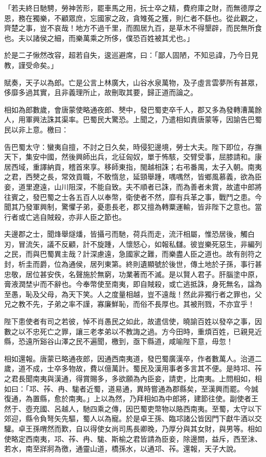 \begin{pinyinscope}
「若夫終日馳騁，勞神苦形，罷車馬之用，抏士卒之精，費府庫之財，而無德厚之恩，務在獨樂，不顧眾庶，忘國家之政，貪雉菟之獲，則仁者不繇也。從此觀之，齊楚之事，豈不哀哉！地方不過千里，而囿居九百，是草木不得墾辟，而民無所食也。夫以諸侯之細，而樂萬乘之所侈，僕恐百姓被其尤也。」

於是二子愀然改容，超若自失，逡巡避席，曰：「鄙人固陋，不知忌諱，乃今日見教，謹受命矣。」

賦奏，天子以為郎。亡是公言上林廣大，山谷水泉萬物，及子虛言雲夢所有甚眾，侈靡多過其實，且非義理所止，故刪取其要，歸正道而論之。

相如為郎數歲，會唐蒙使略通夜郎、僰中，發巴蜀吏卒千人，郡又多為發轉漕萬餘人，用軍興法誅其渠率。巴蜀民大驚恐。上聞之，乃遣相如責唐蒙等，因諭告巴蜀民以非上意。檄曰：

告巴蜀太守：蠻夷自擅，不討之日久矣，時侵犯邊境，勞士大夫。陛下即位，存撫天下，集安中國，然後興師出兵，北征匈奴，單于怖駭，交臂受事，屈膝請和。康居西域，重譯納貢，稽首來享。移師東指，閩越相誅；右弔番禺，太子入朝。南夷之君，西僰之長，常效貢職，不敢惰怠，延頸舉踵，喁喁然，皆鄉風慕義，欲為臣妾，道里遼遠，山川阻深，不能自致。夫不順者已誅，而為善者未賞，故遣中郎將往賓之，發巴蜀之士各五百人以奉幣，衛使者不然，靡有兵革之事，戰鬥之患。今聞其乃發軍興制，驚懼子弟，憂患長老，郡又擅為轉粟運輸，皆非陛下之意也。當行者或亡逃自賊殺，亦非人臣之節也。

夫邊郡之士，聞烽舉燧燔，皆攝弓而馳，荷兵而走，流汗相屬，惟恐居後，觸白刃，冒流矢，議不反顧，計不旋踵，人懷怒心，如報私讎。彼豈樂死惡生，非編列之民，而與巴蜀異主哉？計深慮遠，急國家之難，而樂盡人臣之道也。故有剖符之封，析圭而爵，位為通侯，居列東第。終則遺顯號於後世，傳土地於子孫，事行甚忠敬，居位甚安佚，名聲施於無窮，功業著而不滅。是以賢人君子。肝腦塗中原，膏液潤埜屮而不辭也。今奉幣使至南夷，即自賊殺，或亡逃抵誅，身死無名，諡為至愚，恥及父母，為天下笑。人之度量相越，豈不遠哉！然此非獨行者之罪也，父兄之教不先，子弟之率不謹，寡廉鮮恥，而俗不長厚也。其被刑戮，不亦宜乎！

陛下患使者有司之若彼，悼不肖愚民之如此，故遣信使，曉諭百姓以發卒之事，因數之以不忠死亡之罪，讓三老孝弟以不教誨之過。方今田時，重煩百姓，已親見近縣，恐遠所谿谷山澤之民不遍聞，檄到，亟下縣道，咸喻陛下意，毋忽！

相如還報。唐蒙已略通夜郎，因通西南夷道，發巴蜀廣漢卒，作者數萬人。治道二歲，道不成，士卒多物故，費以億萬計。蜀民及漢用事者多言其不便。是時邛、莋之君長聞南夷與漢通，得賞賜多，多欲願為內臣妾，請吏，比南夷。上問相如，相如曰：「邛、莋、冉、駹者近蜀，道易通，異時嘗通為郡縣矣，至漢興而罷。今誠復通，為置縣，愈於南夷。」上以為然，乃拜相如為中郎將，建節往使。副使者王然于、壺充國、呂越人，馳四乘之傳，因巴蜀吏幣物以賂西南夷。至蜀，太守以下郊迎，縣令負弩矢先驅，蜀人以為寵。於是卓王孫、臨邛諸公皆因門下獻牛酒以交驩。卓王孫喟然而歎，自以得使女尚司馬長卿晚，乃厚分與其女財，與男等。相如使略定西南夷，邛、莋、冉、駹、斯榆之君皆請為臣妾，除邊關，益斥，西至沬、若水，南至牂牁為徼，通靈山道，橋孫水，以通邛、莋。還報，天子大說。


\end{pinyinscope}
